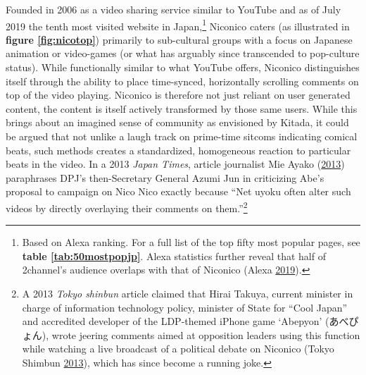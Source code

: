 \documentclass[10pt,british,A4paper,twoside]{memoir}
\begin{document}
Founded in 2006 as a video sharing service similar to YouTube and as of
July 2019 the tenth most visited website in Japan,\footnote{Based on
  Alexa ranking. For a full list of the top fifty most popular pages,
  see \textbf{table \ref{tab:50mostpopjp}}. Alexa statistics further
  reveal that half of 2channel's audience overlaps with that of Niconico
  (Alexa \protect\hyperlink{ref-alexa_alexa_2019}{2019}).} Niconico
caters (as illustrated in \textbf{figure \ref{fig:nicotop}}) primarily
to sub-cultural groups with a focus on Japanese animation or video-games
(or what has arguably since transcended to pop-culture status). While
functionally similar to what YouTube offers, Niconico distinguishes
itself through the ability to place time-synced, horizontally scrolling
comments on top of the video playing. Niconico is therefore not just
reliant on user generated content, the content is itself actively
transformed by those same users. While this brings about an imagined
sense of community as envisioned by Kitada, it could be argued that not
unlike a laugh track on prime-time sitcoms indicating comical beats,
such methods creates a standardized, homogeneous reaction to particular
beats in the video. In a 2013 \emph{Japan Times}, article journalist Mie
Ayako (\protect\hyperlink{ref-mie_xenophobia_2013}{2013}) paraphrases
DPJ's then-Secretary General Azumi Jun in criticizing Abe's proposal to
campaign on Nico Nico exactly because ``Net uyoku often alter such
videos by directly overlaying their comments on them.''\footnote{A 2013
  \emph{Tokyo shinbun} article claimed that Hirai Takuya, current
  minister in charge of information technology policy, minister of State
  for ``Cool Japan'' and accredited developer of the LDP-themed iPhone
  game `Abepyon' (あべぴょん), wrote jeering comments aimed at
  opposition leaders using this function while watching a live broadcast
  of a political debate on Niconico (Tokyo Shimbun
  \protect\hyperlink{ref-tokyo_shimbun_tokyo_2013}{2013}), which has
  since become a running joke.}
\end{document}
